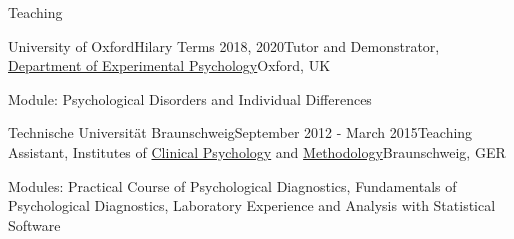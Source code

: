 \documentclass{resume} %
\begin{document}


\begin{rSection}{Teaching}

\begin{rSubsection}{University of Oxford}{Hilary Terms 2018, 2020}{Tutor and Demonstrator, \href{https://www.psy.ox.ac.uk/}{Department of Experimental Psychology}}{Oxford, UK}
  \item Module: Psychological Disorders and Individual Differences
\end{rSubsection}

\begin{rSubsection}{Technische Universit{\"a}t Braunschweig}{September 2012 - March 2015}{Teaching Assistant, Institutes of \href{https://www.tu-braunschweig.de/psychologie/klinische}{Clinical Psychology} and \href{https://www.tu-braunschweig.de/psychologie/methoden}{Methodology}}{Braunschweig, GER}
  \item Modules: Practical Course of Psychological Diagnostics, Fundamentals of Psychological Diagnostics, Laboratory Experience and Analysis with Statistical Software
\end{rSubsection}

\end{rSection}


%
%
%
\end{document}
